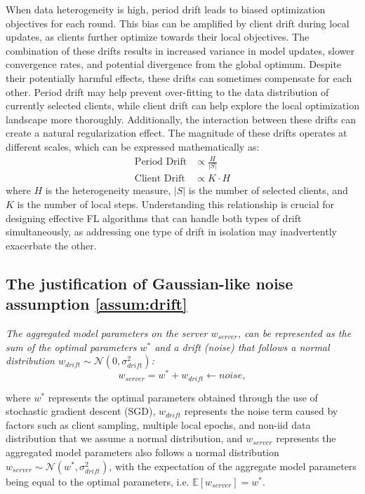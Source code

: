 When data heterogeneity is high, period drift leads to biased optimization objectives for each round. This bias can be amplified by client drift during local updates, as clients further optimize towards their local objectives. The combination of these drifts results in increased variance in model updates, slower convergence rates, and potential divergence from the global optimum.
Despite their potentially harmful effects, these drifts can sometimes compensate for each other. Period drift may help prevent over-fitting to the data distribution of currently selected clients, while client drift can help explore the local optimization landscape more thoroughly. Additionally, the interaction between these drifts can create a natural regularization effect.
The magnitude of these drifts operates at different scales, which can be expressed mathematically as:
\begin{equation}
    \begin{aligned}
        \text{Period Drift} &\propto \frac{H}{|S|} \\
        \text{Client Drift} &\propto K \cdot H
    \end{aligned}
\end{equation}
where $H$ is the heterogeneity measure, $|S|$ is the number of selected clients, and $K$ is the number of local steps.
Understanding this relationship is crucial for designing effective FL algorithms that can handle both types of drift simultaneously, as addressing one type of drift in isolation may inadvertently exacerbate the other.



\subsection{The justification of Gaussian-like noise assumption \ref{assum:drift}}\label{sec:assum1_just}
\begin{assumption}[\ref{assum:drift}]
   \textit{The aggregated model parameters on the server $w_{server}$, can be represented as the sum of the optimal parameters $w^*$ and a drift (noise) that follows a normal distribution ${w}_{drift} \sim \mathcal{N}(0,\sigma_{drift}^2)$:}
   \begin{equation}
      {w}_{server}={w}^*+{w}_{drift}\leftarrow noise,
   \end{equation}
\end{assumption}
where $w^*$ represents the optimal parameters obtained through the use of stochastic gradient descent (SGD), $w_{drift}$ represents the noise term caused by factors such as client sampling, multiple local epochs, and non-iid data distribution that we assume a normal distribution, and $w_{server}$ represents the aggregated model parameters also follows a normal distribution ${w}_{server} \sim \mathcal{N}(w^*,\sigma_{drift}^2)$, with the expectation of the aggregate model parameters being equal to the optimal parameters, i.e. $\mathbb{E}[{w}_{server}]={w}^*$. 

